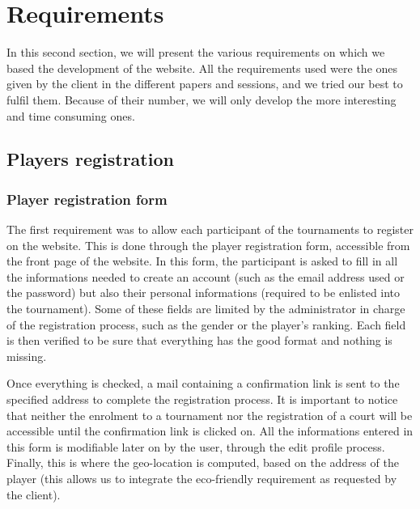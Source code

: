 \section{Requirements}
\label{sec:Requirements}


In this second section, we will present the various requirements on which we based the development of the website. All the requirements used were the ones given by the client in the different papers and sessions, and we tried our best to fulfil them. Because of their number, we will only develop the more interesting and time consuming ones.

\subsection{Players registration}
\label{sub:Players registration}

\subsubsection{Player registration form}
\label{subs:Registration form}


The first requirement was to allow each participant of the tournaments to register on the website. This is done through the player registration form, accessible from the front page of the website. In this form, the participant is asked to fill in all the informations needed to create an account (such as the email address used or the password) but also their personal informations (required to be enlisted into the tournament). Some of these fields are limited by the administrator in charge of the registration process, such as the gender or the player's ranking. Each field is then verified to be sure that everything has the good format and nothing is missing. \newline

Once everything is checked, a mail containing a confirmation link is sent to the specified address to complete the registration process. It is important to notice that neither the enrolment to a tournament nor the registration of a court will be accessible until the confirmation link is clicked on. All the informations entered in this form is modifiable later on by the user, through the edit profile process. Finally, this is where the geo-location is computed, based on the address of the player (this allows us to integrate the eco-friendly requirement as requested by the client). \newline

